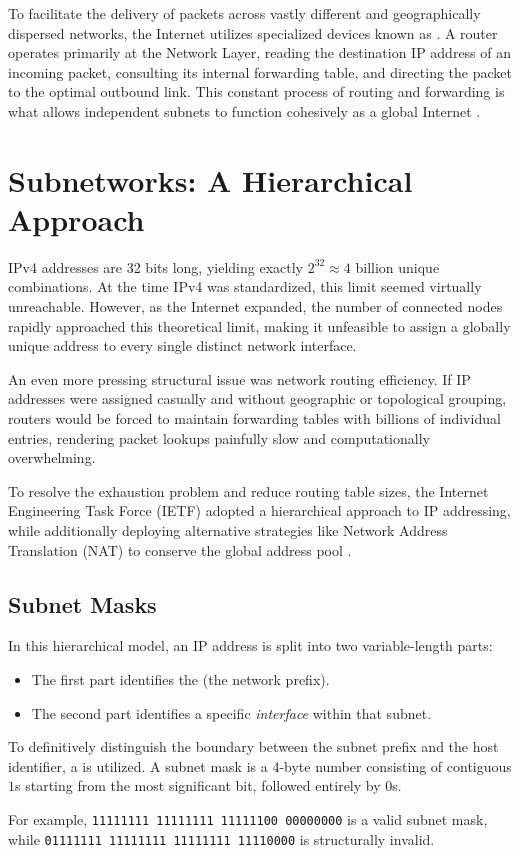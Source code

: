 To facilitate the delivery of packets across vastly different and geographically dispersed networks, the Internet utilizes specialized devices known as . 
A router operates primarily at the Network Layer, reading the destination IP address of an incoming packet, consulting its internal forwarding table, and directing the packet to the optimal outbound link. 
This constant process of routing and forwarding is what allows independent subnets to function cohesively as a global Internet \cite{kurose2017}.

\section{Subnetworks: A Hierarchical Approach}
IPv4 addresses are 32 bits long, yielding exactly \(2^{32} \approx 4\) billion unique combinations. 
At the time IPv4 was standardized, this limit seemed virtually unreachable. 
However, as the Internet expanded, the number of connected nodes rapidly approached this theoretical limit, making it unfeasible to assign a globally unique address to every single distinct network interface.

An even more pressing structural issue was network routing efficiency. 
If IP addresses were assigned casually and without geographic or topological grouping, routers would be forced to maintain forwarding tables with billions of individual entries, rendering packet lookups painfully slow and computationally overwhelming.

To resolve the exhaustion problem and reduce routing table sizes, the Internet Engineering Task Force (IETF) adopted a hierarchical approach to IP addressing, while additionally deploying alternative strategies like Network Address Translation (NAT) to conserve the global address pool \cite{rfc1631}.

\subsection{Subnet Masks}
In this hierarchical model, an IP address is split into two variable-length parts:
\begin{itemize}
    \item The first part identifies the  (the network prefix).
    \item The second part identifies a specific \emph{interface} within that subnet.
\end{itemize}

To definitively distinguish the boundary between the subnet prefix and the host identifier, a  is utilized. 
A subnet mask is a 4-byte number consisting of contiguous \(1\)s starting from the most significant bit, followed entirely by \(0\)s. 
\begin{example}{}
    For example, \texttt{11111111 11111111 11111100 00000000} is a valid subnet mask, while \texttt{01111111 11111111 11111111 11110000} is structurally invalid.
\end{example}

